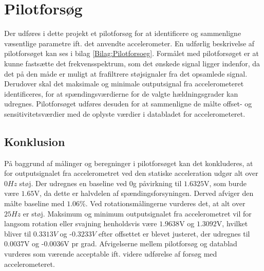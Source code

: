 \section{Pilotforsøg}\label{Sec:PilotforsoegKort}
Der udføres i dette projekt et pilotforsøg for at identificere og sammenligne væsentlige parametre ift. det anvendte accelerometer. En udførlig beskrivelse af pilotforsøget kan ses i bilag \ref{Bilag:Pilotforsoeg}.
Formålet med pilotforsøget er at kunne fastsætte det frekvensspektrum, som det ønskede signal ligger indenfor, da det på den måde er muligt at frafiltrere støjsignaler fra det opsamlede signal. Derudover skal det maksimale og minimale outputsignal fra accelerometeret identificeres, for at spændingsværdierne for de valgte hældningsgrader kan udregnes. Pilotforsøget udføres desuden for at sammenligne de målte offset- og sensitivitetsværdier med de oplyste værdier i databladet for accelerometeret. 
\subsection{Konklusion}
På baggrund af målinger og beregninger i pilotforsøget kan det konkluderes, at for outputsignalet fra accelerometret ved den statiske acceleration udgør alt over $0Hz$ støj. Der udregnes en baseline ved $0$g påvirkning til $1.6325$V, som burde være $1.65$V, da dette er halvdelen af spændingsforsyningen. Derved afviger den målte baseline med $1.06$\%. Ved rotationsmålingerne vurderes det, at alt over $25Hz$ er støj. Maksimum og minimum outputsignalet fra accelerometret vil for langsom rotation eller svajning henholdsvis være $1.9638$V og $1.3092$V, hvilket bliver til $0.3313V$ og -$0.3233V$ efter offsettet er blevet justeret, der udregnes til $0.0037$V og -$0.0036$V pr grad. Afvigelserne mellem pilotforsøg og datablad vurderes som værende acceptable ift. videre udførelse af forsøg med accelerometeret. 

